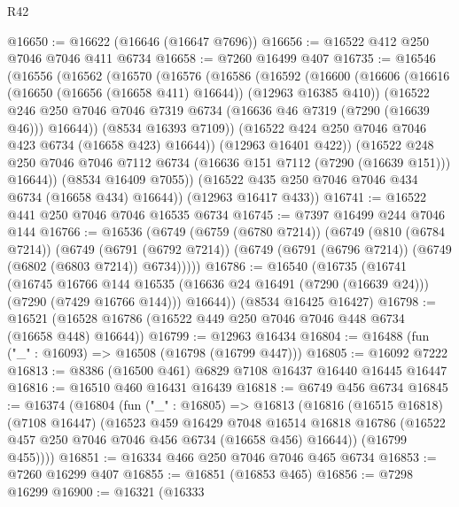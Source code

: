 \begin{lexlean}{R42}
\begin{coremodule}
{@16650 := @16622 (@16646 (@16647 @7696))
@16656 := @16522 @412 @250 @7046 @7046 @411 @6734
@16658 := @7260 @16499 @407
@16735 := @16546
    (@16556
      (@16562
        (@16570
          (@16576
            (@16586
              (@16592
                (@16600
                  (@16606
                    (@16616 (@16650 (@16656 (@16658 @411) @16644)) (@12963 @16385 @410))
                    (@16522
                      @246
                      @250
                      @7046
                      @7046
                      @7319
                      @6734
                      (@16636 @46 @7319 (@7290 (@16639 @46)))
                      @16644))
                  (@8534 @16393 @7109))
                (@16522 @424 @250 @7046 @7046 @423 @6734 (@16658 @423) @16644))
              (@12963 @16401 @422))
            (@16522
              @248
              @250
              @7046
              @7046
              @7112
              @6734
              (@16636 @151 @7112 (@7290 (@16639 @151)))
              @16644))
          (@8534 @16409 @7055))
        (@16522 @435 @250 @7046 @7046 @434 @6734 (@16658 @434) @16644))
      (@12963 @16417 @433))
@16741 := @16522 @441 @250 @7046 @7046 @16535 @6734
@16745 := @7397 @16499 @244 @7046 @144
@16766 := @16536
    (@6749
      (@6759 (@6780 @7214))
      (@6749
        (@810 (@6784 @7214))
        (@6749
          (@6791 (@6792 @7214))
          (@6749 (@6791 (@6796 @7214)) (@6749 (@6802 (@6803 @7214)) @6734)))))
@16786 := @16540
    (@16735
      (@16741
        (@16745
          @16766
          @144
          @16535
          (@16636 @24 @16491 (@7290 (@16639 @24)))
          (@7290 (@7429 @16766 @144)))
        @16644))
    (@8534 @16425 @16427)
@16798 := @16521 (@16528 @16786 (@16522 @449 @250 @7046 @7046 @448 @6734 (@16658 @448) @16644))
@16799 := @12963 @16434
@16804 := @16488 (fun ("_" : @16093) => @16508 (@16798 (@16799 @447)))
@16805 := @16092 @7222
@16813 := @8386 (@16500 @461) @6829 @7108 @16437 @16440 @16445 @16447
@16816 := @16510 @460 @16431 @16439
@16818 := @6749 @456 @6734
@16845 := @16374
    (@16804
      (fun ("_" : @16805) =>
      @16813
        (@16816
          (@16515 @16818)
          (@7108 @16447)
          (@16523
            @459
            @16429
            @7048
            @16514
            @16818
            @16786
            (@16522 @457 @250 @7046 @7046 @456 @6734 (@16658 @456) @16644))
          (@16799 @455))))
@16851 := @16334 @466 @250 @7046 @7046 @465 @6734
@16853 := @7260 @16299 @407
@16855 := @16851 (@16853 @465)
@16856 := @7298 @16299
@16900 := @16321
    (@16333
}
\end{coremodule}
\end{lexlean}
